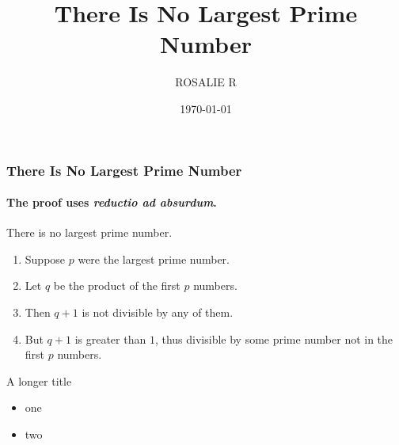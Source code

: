\documentclass{beamer}
\title{There Is No Largest Prime Number}
\date{\today}
\author{ROSALIE R}
\begin{document}
	
	\begin{frame}
		\titlepage
	\end{frame}
	
	
	\begin{frame} 
		\frametitle{There Is No Largest Prime Number} 
		\framesubtitle{The proof uses \textit{reductio ad absurdum}.} 
		\begin{theorem}
			There is no largest prime number. \end{theorem} 
		\begin{enumerate} 
			\item<1-| alert@1> Suppose $p$ were the largest prime number. 
			\item<2-> Let $q$ be the product of the first $p$ numbers. 
			\item<3-> Then $q+1$ is not divisible by any of them. 
			\item<1-> But $q + 1$ is greater than $1$, thus divisible by some prime
			number not in the first $p$ numbers.
		\end{enumerate}
	\end{frame}
	
	\begin{frame}{A longer title}
		\begin{itemize}
			\item one
			\item two
		\end{itemize}
	\end{frame}
	
\end{document}
